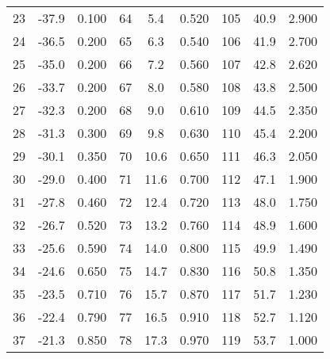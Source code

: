 \begin{table}
\begin{tabular}{c c c@{\hskip 0.5cm}||@{\hskip 0.5cm} c c c@{\hskip 0.5cm} ||@{\hskip 0.5cm} c c c}
23  &    -37.9    &       0.100   & 64  &    5.4      &       0.520   &  105 &    40.9     &       2.900  \\                                      
24  &    -36.5    &       0.200   & 65  &    6.3      &       0.540   &  106 &    41.9     &       2.700   \\                                    
25  &    -35.0    &       0.200   & 66  &    7.2      &       0.560   &  107 &    42.8     &       2.620  \\                                    
26  &    -33.7    &       0.200   & 67  &    8.0      &       0.580   &  108 &    43.8     &       2.500   \\   
27  &    -32.3    &       0.200   & 68  &    9.0      &       0.610   &  109 &    44.5     &       2.350  \\                                    
28  &    -31.3    &       0.300   & 69  &    9.8      &       0.630   &  110 &    45.4     &       2.200   \\                                    
29  &    -30.1    &       0.350   & 70  &    10.6     &       0.650   &  111 &    46.3     &       2.050  \\                                     
30  &    -29.0    &       0.400   & 71  &    11.6     &       0.700    &  112 &    47.1     &       1.900  \\                                    
31  &    -27.8    &       0.460   & 72  &    12.4     &       0.720   &  113 &    48.0       &       1.750  \\                                     
32  &    -26.7    &       0.520   & 73  &    13.2     &       0.760   &  114 &    48.9     &       1.600   \\                                     
33  &    -25.6    &       0.590   & 74  &    14.0     &       0.800    &  115 &    49.9     &       1.490  \\                                     
34  &    -24.6    &       0.650   & 75  &    14.7     &       0.830   &  116 &    50.8     &       1.350  \\                                     
35  &    -23.5    &       0.710   & 76  &    15.7     &       0.870   &  117 &    51.7     &       1.230  \\                                     
36  &    -22.4    &       0.790   & 77  &    16.5     &       0.910   &  118 &    52.7     &       1.120  \\                                     
37  &    -21.3    &       0.850   & 78  &    17.3     &       0.970   &  119 &    53.7     &       1.000  \\                                     

\end{tabular}
\end{table}
